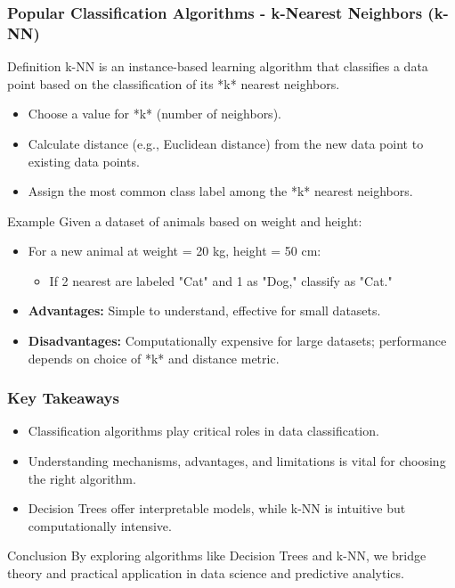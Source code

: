 \documentclass[aspectratio=169]{beamer}
\begin{document}
\begin{frame}[fragile]
    \frametitle{Popular Classification Algorithms - k-Nearest Neighbors (k-NN)}
    \begin{block}{Definition}
        k-NN is an instance-based learning algorithm that classifies a data point based on the classification of its *k* nearest neighbors.
    \end{block}
    
    \begin{itemize}
        \item Choose a value for *k* (number of neighbors).
        \item Calculate distance (e.g., Euclidean distance) from the new data point to existing data points.
        \item Assign the most common class label among the *k* nearest neighbors.
    \end{itemize}

    \begin{block}{Example}
        Given a dataset of animals based on weight and height:
        \begin{itemize}
            \item For a new animal at weight = 20 kg, height = 50 cm:
            \begin{itemize}
                \item If 2 nearest are labeled "Cat" and 1 as "Dog," classify as "Cat."
            \end{itemize}
        \end{itemize}
    \end{block}
    
    \begin{itemize}
        \item \textbf{Advantages:} Simple to understand, effective for small datasets.
        \item \textbf{Disadvantages:} Computationally expensive for large datasets; performance depends on choice of *k* and distance metric.
    \end{itemize}
\end{frame}

\begin{frame}[fragile]
    \frametitle{Key Takeaways}
    \begin{itemize}
        \item Classification algorithms play critical roles in data classification.
        \item Understanding mechanisms, advantages, and limitations is vital for choosing the right algorithm.
        \item Decision Trees offer interpretable models, while k-NN is intuitive but computationally intensive.
    \end{itemize}

    \begin{block}{Conclusion}
        By exploring algorithms like Decision Trees and k-NN, we bridge theory and practical application in data science and predictive analytics.
    \end{block}
\end{frame}
\end{document}

